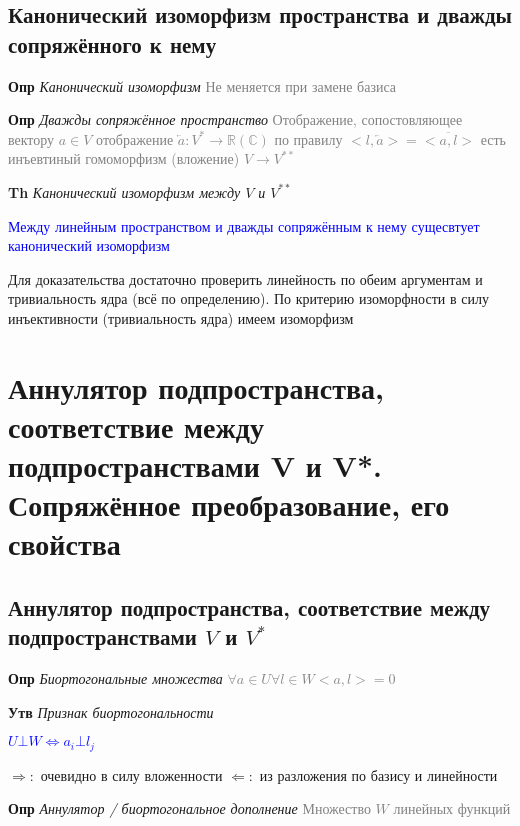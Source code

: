 \documentclass[a4paper, 14pt]{article}
\begin{document}
    \subsection{Канонический изоморфизм пространства и дважды сопряжённого к нему}
    
    \textbf{Опр} \textit{Канонический изоморфизм} \textcolor{gray}{Не меняется при замене базиса}
    
    \textbf{Опр} \textit{Дважды сопряжённое пространство} \textcolor{gray}{Отображение, сопостовляющее
    вектору $a \in V$ отображение $\overleftarrow{a}: V^* \rightarrow \mathbb{R} (\mathbb{C})$ по
    правилу $<l, \overleftarrow{a}> = \overline{<a, l>}$ есть инъевтиный гомоморфизм (вложение) $V \rightarrow V^{**}$}
    
    \textbf{Th} \textit{Канонический изоморфизм между $V$ и $V^{**}$}
    
    \textcolor{blue}{Между линейным пространством и дважды сопряжённым к нему сущесвтует канонический изоморфизм}
    
    Для доказательства достаточно проверить линейность по обеим аргументам и тривиальность ядра (всё по
    определению).
    По критерию изоморфности в силу инъективности (тривиальность ядра) имеем изоморфизм
    
    \section{Аннулятор подпространства, соответствие между подпространствами V и V*.
    Сопряжённое преобразование, его свойства}
    
    \subsection{Аннулятор подпространства, соответствие между подпространствами $V$ и $V^*$}
    
    \textbf{Опр} \textit{Биортогональные множества} \textcolor{gray}{$\forall a \in U \forall l \in W <a, l> = 0$}
    
    \textbf{Утв} \textit{Признак биортогональности}
    
    \textcolor{blue}{$U \bot W \Leftrightarrow a_i \bot l_j$}
    
    $\Rightarrow:$ очевидно в силу вложенности
    $\Leftarrow:$ из разложения по базису и линейности
    
    \textbf{Опр} \textit{Аннулятор / биортогональное дополнение} \textcolor{gray}{Множество $W$ линейных функций}
    
\end{document}
